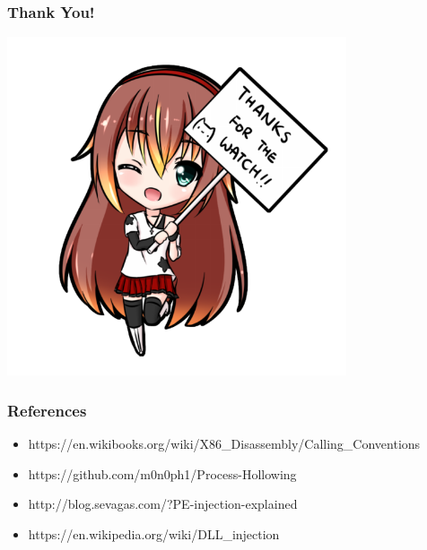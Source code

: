 \documentclass[aspectratio=169]{beamer}
\begin{document}
\begin{frame}
  \frametitle{Thank You!}
  \begin{center}
    \includegraphics[width=10cm]{anime-thank-you}
  \end{center}
\end{frame}

\begin{frame}
  \frametitle{References}
  \begin{center}
    \begin{itemize}
      \item{https://en.wikibooks.org/wiki/X86\_Disassembly/Calling\_Conventions}
      \item{https://github.com/m0n0ph1/Process-Hollowing}
      \item{http://blog.sevagas.com/?PE-injection-explained}
      \item{https://en.wikipedia.org/wiki/DLL\_injection}
    \end{itemize}
  \end{center}
\end{frame}
\end{document}
